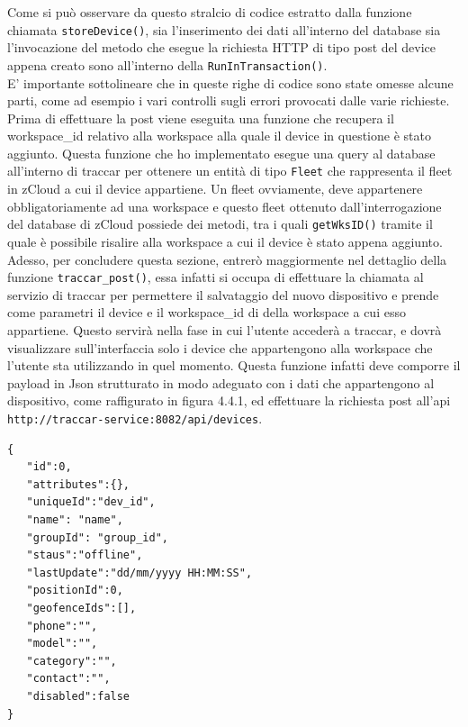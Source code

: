 \documentclass[a4paper,titlepage,12pt]{book}
\begin{document}
{\noindent Come si può osservare da questo stralcio di codice estratto dalla funzione chiamata \texttt{storeDevice()}, sia l'inserimento dei dati all'interno del database sia l'invocazione del metodo che esegue la richiesta HTTP di tipo post del device appena creato sono all'interno della \texttt{RunInTransaction()}.\\
E' importante sottolineare che in queste righe di codice sono state omesse alcune parti, come ad esempio i vari controlli sugli errori provocati dalle varie richieste.\\
Prima di effettuare la post viene eseguita una funzione che recupera il workspace\_id relativo alla workspace alla quale il device in questione è stato aggiunto. Questa funzione che ho implementato esegue una query al database all'interno di traccar per ottenere un entità di tipo \texttt{Fleet} che rappresenta il fleet in zCloud a cui il device appartiene. Un fleet ovviamente, deve appartenere obbligatoriamente ad una workspace e questo fleet ottenuto dall'interrogazione del database di zCloud possiede dei metodi, tra i quali \texttt{getWksID()} tramite il quale è possibile risalire alla workspace a cui il device è stato appena aggiunto.\\
Adesso, per concludere questa sezione, entrerò maggiormente nel dettaglio della funzione \texttt{traccar\_post()}, essa infatti si occupa di effettuare la chiamata al servizio di traccar per permettere il salvataggio del nuovo dispositivo e prende come parametri il device e il workspace\_id di della workspace a cui esso appartiene. Questo servirà nella fase in cui l'utente accederà a traccar, e dovrà visualizzare sull'interfaccia solo i device che appartengono alla workspace che l'utente sta utilizzando in quel momento. Questa funzione infatti deve comporre il payload in Json strutturato in modo adeguato con i dati che appartengono al dispositivo, come raffigurato in figura 4.4.1, ed effettuare la richiesta post all'api \texttt{http://traccar-service:8082/api/devices}.

\begin{verbatim}
{
   "id":0,
   "attributes":{},
   "uniqueId":"dev_id",
   "name": "name",
   "groupId": "group_id",
   "staus":"offline",
   "lastUpdate":"dd/mm/yyyy HH:MM:SS",
   "positionId":0,
   "geofenceIds":[],
   "phone":"",
   "model":"",
   "category":"",
   "contact":"",
   "disabled":false
}

\end{verbatim}

}
\end{document}
